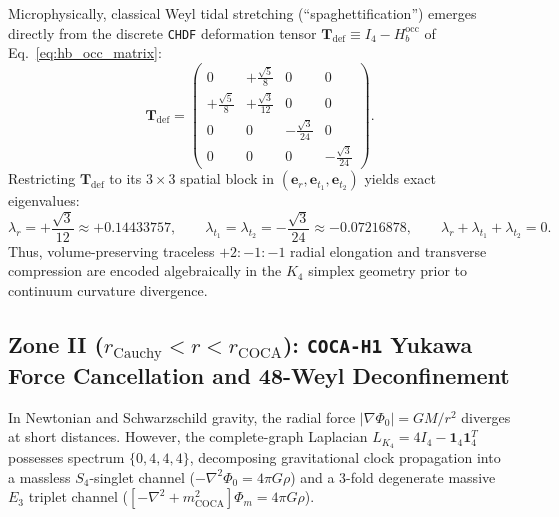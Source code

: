 \documentclass[11pt,a4paper]{article}
\theoremstyle{remark}
\begin{document}
Microphysically, classical Weyl tidal stretching (``spaghettification'') emerges directly from the discrete \texttt{CHDF} deformation tensor $\mathbf{T}_{\mathrm{def}} \equiv I_4 - H_b^{\mathrm{occ}}$ of Eq.~\eqref{eq:hb_occ_matrix}:
\begin{equation}
  \mathbf{T}_{\mathrm{def}} =
  \begin{pmatrix}
    0 & +\frac{\sqrt{5}}{8} & 0 & 0 \\[4pt]
    +\frac{\sqrt{5}}{8} & +\frac{\sqrt{3}}{12} & 0 & 0 \\[4pt]
    0 & 0 & -\frac{\sqrt{3}}{24} & 0 \\[4pt]
    0 & 0 & 0 & -\frac{\sqrt{3}}{24}
  \end{pmatrix}.
  \label{eq:tdef_matrix}
\end{equation}
Restricting $\mathbf{T}_{\mathrm{def}}$ to its $3\times 3$ spatial block in $(\mathbf{e}_r, \mathbf{e}_{t_1}, \mathbf{e}_{t_2})$ yields exact eigenvalues:
\begin{equation}
  \lambda_r = +\frac{\sqrt{3}}{12} \approx +0.14433757, \qquad
  \lambda_{t_1} = \lambda_{t_2} = -\frac{\sqrt{3}}{24} \approx -0.07216878, \qquad
  \lambda_r + \lambda_{t_1} + \lambda_{t_2} = 0.
  \label{eq:tidal_eigenvalues}
\end{equation}
Thus, volume-preserving traceless $+2 : -1 : -1$ radial elongation and transverse compression are encoded algebraically in the $K_4$ simplex geometry prior to continuum curvature divergence.

\subsection{Zone II (\texorpdfstring{$r_{\mathrm{Cauchy}} < r < r_{\mathrm{COCA}}$}{r\_Cauchy < r < r\_COCA}): \texttt{COCA-H1} Yukawa Force Cancellation and 48-Weyl Deconfinement}

In Newtonian and Schwarzschild gravity, the radial force $|\nabla\Phi_0| = GM/r^2$ diverges at short distances. However, the complete-graph Laplacian $L_{K_4} = 4I_4 - \mathbf{1}_4\mathbf{1}_4^T$ possesses spectrum $\{0, 4, 4, 4\}$, decomposing gravitational clock propagation into a massless $S_4$-singlet channel ($-\nabla^2\Phi_0 = 4\pi G\rho$) and a 3-fold degenerate massive $E_3$ triplet channel ($[-\nabla^2 + m_{\mathrm{COCA}}^2]\Phi_m = 4\pi G\rho$).
\end{document}
